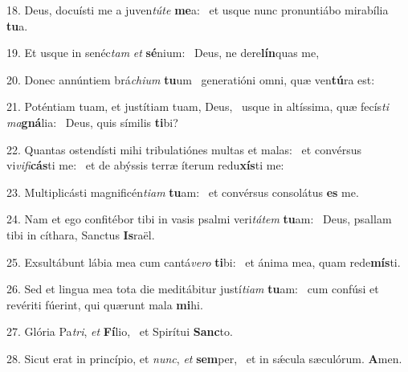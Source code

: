 18. Deus, docuísti me a juven\textit{tú}\textit{te} \textbf{me}a: \ast\  et usque nunc pronuntiábo mirabília \textbf{tu}a.\

19. Et usque in senéc\textit{tam} \textit{et} \textbf{sé}nium: \ast\  Deus, ne dere\textbf{lín}quas me,\

20. Donec annúntiem brá\textit{chi}\textit{um} \textbf{tu}um \ast\  generatióni omni, quæ ven\textbf{tú}ra est:\

21. Poténtiam tuam, et justítiam tuam, Deus, \dag\  usque in altíssima, quæ fecís\textit{ti} \textit{ma}\textbf{gná}lia: \ast\  Deus, quis símilis \textbf{ti}bi?\

22. Quantas ostendísti mihi tribulatiónes multas et malas: \dag\  et convérsus vi\textit{vi}\textit{fi}\textbf{cás}ti me: \ast\  et de abýssis terræ íterum redu\textbf{xís}ti me:\

23. Multiplicásti magnificén\textit{ti}\textit{am} \textbf{tu}am: \ast\  et convérsus consolátus \textbf{es} me.\

24. Nam et ego confitébor tibi in vasis psalmi veri\textit{tá}\textit{tem} \textbf{tu}am: \ast\  Deus, psallam tibi in cíthara, Sanctus \textbf{Is}raël.\

25. Exsultábunt lábia mea cum cantá\textit{ve}\textit{ro} \textbf{ti}bi: \ast\  et ánima mea, quam rede\textbf{mís}ti.\

26. Sed et lingua mea tota die meditábitur justí\textit{ti}\textit{am} \textbf{tu}am: \ast\  cum confúsi et revériti fúerint, qui quærunt mala \textbf{mi}hi.\

27. Glória Pa\textit{tri}, \textit{et} \textbf{Fí}lio, \ast\  et Spirítui \textbf{Sanc}to.\

28. Sicut erat in princípio, et \textit{nunc}, \textit{et} \textbf{sem}per, \ast\  et in sǽcula sæculórum. \textbf{A}men.\


